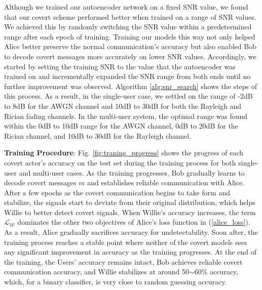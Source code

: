 Although we trained our autoencoder network on a fixed SNR value, we found that our covert scheme performed better when trained on a range of SNR values. We achieved this by randomly switching the SNR value within a predetermined range after each epoch of training. Training our models this way not only helped Alice better preserve the normal communication's accuracy but also enabled Bob to decode covert messages more accurately on lower SNR values. Accordingly, we started by setting the training SNR to the value that the autoencoder was trained on and incrementally expanded the SNR range from both ends until no further improvement was observed. Algorithm \ref{alg:snr_search} shows the steps of this process. As a result, in the single-user case, we settled on the range of -2dB to 8dB for the AWGN channel and 10dB to 30dB for both the Rayleigh and Rician fading channels. In the multi-user system, the optimal range was found within the 0dB to 10dB range for the AWGN channel, 0dB to 20dB for the Rician channel, and 10dB to 30dB for the Rayleigh channel.

\textbf{Training Procedure}: Fig. \ref{fig:traning_progress} shows the progress of each covert actor's accuracy on the test set during the training process for both single-user and multi-user cases. As the training progresses, Bob gradually learns to decode covert messages \(m\) and establishes reliable communication with Alice. After a few epochs as the covert communication begins to take form and stabilize, the signals start to deviate from their original distribution, which helps Willie to better detect covert signals. When Willie's accuracy increases, the term \(\mathcal{L}_{\mathcal{W}}\) dominates the other two objectives of Alice's loss function in (\ref{alice_loss}). As a result, Alice gradually sacrifices accuracy for undetectability. Soon after, the training process reaches a stable point where neither of the covert models sees any significant improvement in accuracy as the training progresses. At the end of the training, the Users' accuracy remains intact, Bob achieves reliable covert communication accuracy, and Willie stabilizes at around 50$\sim$60\% accuracy, which, for a binary classifier, is very close to random guessing accuracy.

